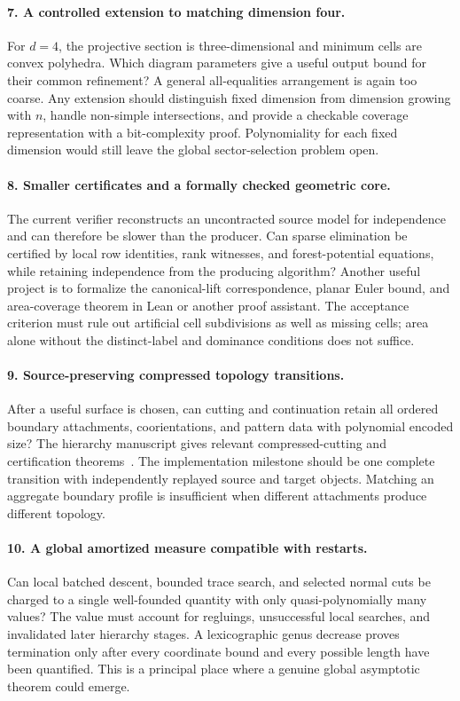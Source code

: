 \paragraph{7. A controlled extension to matching dimension four.}
For \(d=4\), the projective section is three-dimensional and
minimum cells are convex polyhedra.  Which diagram parameters
give a useful output bound for their common refinement?  A
general all-equalities arrangement is again too coarse.
Any extension should distinguish fixed dimension from
dimension growing with \(n\), handle non-simple intersections,
and provide a checkable coverage representation with a
bit-complexity proof.  Polynomiality for each fixed dimension
would still leave the global sector-selection problem open.

\paragraph{8. Smaller certificates and a formally checked geometric core.}
The current verifier reconstructs an uncontracted source model
for independence and can therefore be slower than the producer.
Can sparse elimination be certified by local row identities,
rank witnesses, and forest-potential equations, while retaining
independence from the producing algorithm?  Another useful
project is to formalize the canonical-lift correspondence,
planar Euler bound, and area-coverage theorem in Lean or another
proof assistant.  The acceptance criterion must rule out
artificial cell subdivisions as well as missing cells; area
alone without the distinct-label and dominance conditions
does not suffice.

\paragraph{9. Source-preserving compressed topology transitions.}
After a useful surface is chosen, can cutting and continuation
retain all ordered boundary attachments, coorientations, and
pattern data with polynomial encoded size?  The hierarchy
manuscript gives relevant compressed-cutting and certification
theorems~\cite{Lackenby2026}.  The implementation milestone
should be one complete transition with independently replayed
source and target objects.  Matching an aggregate boundary
profile is insufficient when different attachments produce
different topology.

\paragraph{10. A global amortized measure compatible with restarts.}
Can local batched descent, bounded trace search, and selected
normal cuts be charged to a single well-founded quantity with
only quasi-polynomially many values?  The value must account
for regluings, unsuccessful local searches, and invalidated
later hierarchy stages.  A lexicographic genus decrease proves
termination only after every coordinate bound and every
possible length have been quantified.  This is a principal
place where a genuine global asymptotic theorem could emerge.

